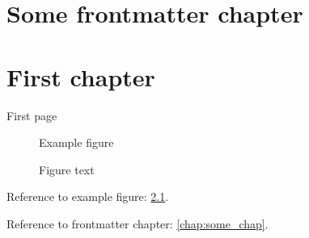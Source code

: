 \documentclass{uit-thesis-test}
\begin{document}
\frontmatter

\chapter{Some frontmatter chapter}\label{chap:some_chap}

\tableofcontents

\mainmatter

\chapter{First chapter}

First page

\begin{figure}[h]
\centering
Example figure
\caption{Figure text}\label{fig:example}
\end{figure}

\newpage

Reference to example figure: \ref{fig:example}.

Reference to frontmatter chapter: \autoref{chap:some_chap}.
\end{document}
